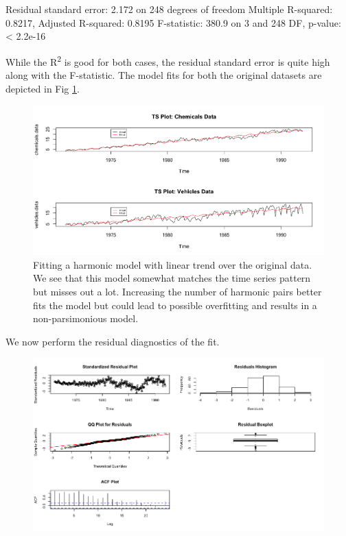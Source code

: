 \begin{enumerate}[label=(\roman*)]
\begin{block}
Residual standard error: 2.172 on 248 degrees of freedom
Multiple R-squared:  0.8217,	Adjusted R-squared:  0.8195 
F-statistic: 380.9 on 3 and 248 DF,  p-value: < 2.2e-16
\end{block}
\normalsize While the R\textsuperscript{2} is good for both cases, the residual standard error is quite high along with the F-statistic. The model fits for both the original datasets are depicted in Fig \ref{fig:harmonic_fit}. 
\begin{figure}[!htb]
    \centering
    \includegraphics[width=\linewidth]{Images/P3/LFits_Original.png}
    \caption[Fitting a harmonic model with linear trend over the original data.]{Fitting a harmonic model with linear trend over the original data. We see that this model somewhat matches the time series pattern but misses out a lot. Increasing the number of harmonic pairs better fits the model but could lead to possible overfitting and results in a non-parsimonious model.}
    \label{fig:harmonic_fit}
\end{figure}
We now perform the residual diagnostics of the fit. 
\begin{figure}[!htb]
    \centering
    \includegraphics[width=\linewidth]{Images/P3/LFit_Res_Chem.png}

\end{figure}
\end{enumerate}
